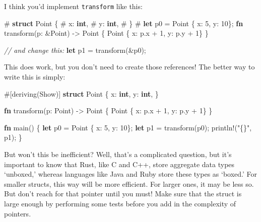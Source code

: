 \documentclass[]{article}
\newenvironment{Shaded}{}{}
\newcommand{\KeywordTok}[1]{\textcolor[rgb]{0.00,0.44,0.13}{\textbf{{#1}}}}
\newcommand{\DecValTok}[1]{\textcolor[rgb]{0.25,0.63,0.44}{{#1}}}
\newcommand{\StringTok}[1]{\textcolor[rgb]{0.25,0.44,0.63}{{#1}}}
\newcommand{\CommentTok}[1]{\textcolor[rgb]{0.38,0.63,0.69}{\textit{{#1}}}}
\newcommand{\OtherTok}[1]{\textcolor[rgb]{0.00,0.44,0.13}{{#1}}}
\newcommand{\NormalTok}[1]{{#1}}
\begin{document}
I think you'd implement \texttt{transform} like this:

\begin{Shaded}
\begin{Highlighting}[]
\NormalTok{# }\KeywordTok{struct} \NormalTok{Point \{}
\NormalTok{#     x: }\KeywordTok{int}\NormalTok{,}
\NormalTok{#     y: }\KeywordTok{int}\NormalTok{,}
\NormalTok{# \}}
\NormalTok{# }\KeywordTok{let} \NormalTok{p0 = Point \{ x: }\DecValTok{5}\NormalTok{, y: }\DecValTok{10}\NormalTok{\};}
\KeywordTok{fn} \NormalTok{transform(p: &Point) -> Point \{}
    \NormalTok{Point \{ x: p.x + }\DecValTok{1}\NormalTok{, y: p.y + }\DecValTok{1}\NormalTok{\}}
\NormalTok{\}}

\CommentTok{// and change this:}
\KeywordTok{let} \NormalTok{p1 = transform(&p0);}
\end{Highlighting}
\end{Shaded}

This does work, but you don't need to create those references! The
better way to write this is simply:

\begin{Shaded}
\begin{Highlighting}[]
\OtherTok{#[}\NormalTok{deriving}\OtherTok{(}\NormalTok{Show}\OtherTok{)]}
\KeywordTok{struct} \NormalTok{Point \{}
    \NormalTok{x: }\KeywordTok{int}\NormalTok{,}
    \NormalTok{y: }\KeywordTok{int}\NormalTok{,}
\NormalTok{\}}

\KeywordTok{fn} \NormalTok{transform(p: Point) -> Point \{}
    \NormalTok{Point \{ x: p.x + }\DecValTok{1}\NormalTok{, y: p.y + }\DecValTok{1}\NormalTok{\}}
\NormalTok{\}}

\KeywordTok{fn} \NormalTok{main() \{}
    \KeywordTok{let} \NormalTok{p0 = Point \{ x: }\DecValTok{5}\NormalTok{, y: }\DecValTok{10}\NormalTok{\};}
    \KeywordTok{let} \NormalTok{p1 = transform(p0);}
    \OtherTok{println!}\NormalTok{(}\StringTok{"\{\}"}\NormalTok{, p1);}
\NormalTok{\}}
\end{Highlighting}
\end{Shaded}

But won't this be inefficient? Well, that's a complicated question, but
it's important to know that Rust, like C and C++, store aggregate data
types `unboxed,' whereas languages like Java and Ruby store these types
as `boxed.' For smaller structs, this way will be more efficient. For
larger ones, it may be less so. But don't reach for that pointer until
you must! Make sure that the struct is large enough by performing some
tests before you add in the complexity of pointers.
\end{document}
